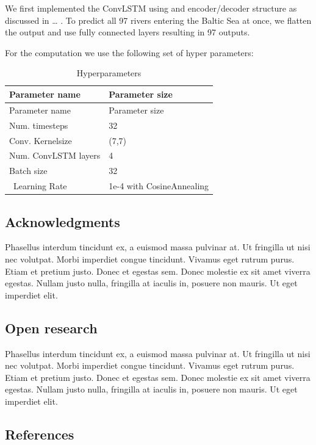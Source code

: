 \documentclass[
  letterpaper,
  DIV=11,
  numbers=noendperiod]{scrartcl}
\newlength{\cslhangindent}
\newlength{\cslentryspacingunit} %
\newenvironment{CSLReferences}[2] %
 {%
  \setlength{\parindent}{0pt}
  \ifodd #1
  \let\oldpar\par
  \def\par{\hangindent=\cslhangindent\oldpar}
  \fi
  \setlength{\parskip}{#2\cslentryspacingunit}
 }%
 {}
\begin{document}
We first implemented the ConvLSTM using and encoder/decoder structure as
discussed in \ldots{} . To predict all 97 rivers entering the Baltic Sea
at once, we flatten the output and use fully connected layers resulting
in 97 outputs.

For the computation we use the following set of hyper parameters:

\hypertarget{tbl-letters}{}
\begin{longtable}[]{@{}ll@{}}
\caption{\label{tbl-letters}Hyperparameters}\tabularnewline
\toprule()
Parameter name & Parameter size \\
\midrule()
\endfirsthead
\toprule()
Parameter name & Parameter size \\
\midrule()
\endhead
Num. timesteps & 32 \\
Conv. Kernelsize & (7,7) \\
Num. ConvLSTM layers & 4 \\
Batch size & 32 \\
~Learning Rate & 1e-4 with CosineAnnealing \\
\bottomrule()
\end{longtable}

\hypertarget{acknowledgments}{%
\subsection{Acknowledgments}\label{acknowledgments}}

Phasellus interdum tincidunt ex, a euismod massa pulvinar at. Ut
fringilla ut nisi nec volutpat. Morbi imperdiet congue tincidunt.
Vivamus eget rutrum purus. Etiam et pretium justo. Donec et egestas sem.
Donec molestie ex sit amet viverra egestas. Nullam justo nulla,
fringilla at iaculis in, posuere non mauris. Ut eget imperdiet elit.

\hypertarget{open-research}{%
\subsection{Open research}\label{open-research}}

Phasellus interdum tincidunt ex, a euismod massa pulvinar at. Ut
fringilla ut nisi nec volutpat. Morbi imperdiet congue tincidunt.
Vivamus eget rutrum purus. Etiam et pretium justo. Donec et egestas sem.
Donec molestie ex sit amet viverra egestas. Nullam justo nulla,
fringilla at iaculis in, posuere non mauris. Ut eget imperdiet elit.

\hypertarget{references}{%
\subsection*{References}\label{references}}

\hypertarget{refs}{}
\begin{CSLReferences}{0}{0}
\end{CSLReferences}
\end{document}

